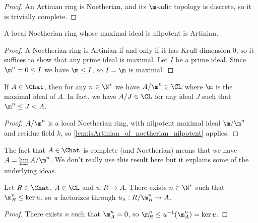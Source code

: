 \begin{proof}
  \leanok
  An Artinian ring is Noetherian, and its $\m$-adic topology is discrete,
  so it is trivially complete.
\end{proof}

\begin{lemma}
  \label{lem:isArtinian_of_noetherian_nilpotent}
  \leanok
  A local Noetherian ring whose maximal ideal is nilpotent is Artinian.
\end{lemma}

\begin{proof}
  \leanok
  A Noetherian ring is Artinian if and only if it has Krull dimension
  0, so it suffices to show that any prime ideal is maximal. Let $I$
  be a prime ideal. Since $\m^n = 0 \le I$ we have $\m \le I$, so
  $I = \m$ is maximal.
\end{proof}

\begin{lemma}
  \label{lem:quotinC}
  \leanok
  If $A \in \Chat$, then for any $n \in \N^*$ we have
  $A / \m^n \in \CL$ where $\m$ is the maximal ideal of $A$.
  In fact, we have $A / J \in \CL$ for any ideal $J$ such that
  $\m^n \le J < A$.
\end{lemma}

\begin{proof}
  \leanok
  $A / \m^n$ is a local Noetherian ring, with nilpotent maximal ideal
  $\m / \m^n$ and residue field $k$, so \cref{lem:isArtinian_of_noetherian_nilpotent}
  applies.
\end{proof}

\begin{remark}
  The fact that $A \in \Chat$ is complete (and Noetherian) means that we have
  $A = \varprojlim A / \m^n$. We don't really use this result here but
  it explains some of the underlying ideas.
\end{remark}

\begin{lemma}
  \label{lem:factorizes}
  \leanok
  Let $R \in \Chat$, $A \in \CL$ and $u : R \to A$. There exists
  $n \in \N^*$ such that $\m_R^n \le \ker u$, so $u$ factorizes
  through $u_n : R/\m_R^n \to A$.
\end{lemma}

\begin{proof}
  \leanok
  There exists $n$ such that $\m_A^n = 0$,
  so $\m_R^n \le u^{-1} (\m_A ^n) = \ker u$.
\end{proof}

